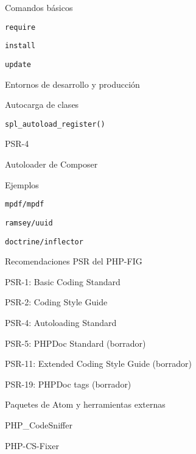 \begin{longenum}
\begin{longenum}
\begin{longenum}
\begin{longenum}
            \end{longenum}
            \item Comandos básicos
            \begin{longenum}
                \item \texttt{require}
                \item \texttt{install}
                \item \texttt{update}
            \end{longenum}
            \item Entornos de desarrollo y producción
        \end{longenum}
        \item Autocarga de clases
        \begin{longenum}
            \item \texttt{spl\_autoload\_register()}
            \item PSR-4
            \item Autoloader de Composer
        \end{longenum}
        \item Ejemplos
        \begin{longenum}
            \item \texttt{mpdf/mpdf}
            \item \texttt{ramsey/uuid}
            \item \texttt{doctrine/inflector}
        \end{longenum}
        \item Recomendaciones PSR del PHP-FIG
        \begin{longenum}
            \item PSR-1: Basic Coding Standard
            \item PSR-2: Coding Style Guide
            \item PSR-4: Autoloading Standard
            \item PSR-5: PHPDoc Standard (borrador)
            \item PSR-11: Extended Coding Style Guide (borrador)
            \item PSR-19: PHPDoc tags (borrador)
        \end{longenum}
        \item Paquetes de Atom y herramientas externas \opcional\
        \begin{longenum}
            \item PHP\_CodeSniffer
            \item PHP-CS-Fixer

\end{longenum}
\end{longenum}
\end{longenum}
